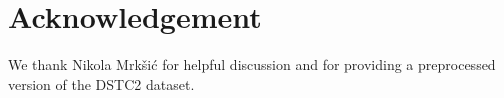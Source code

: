 \documentclass[11pt,a4paper]{article}
\begin{document}
\section*{Acknowledgement}
We thank Nikola Mrk\v{s}i\'{c} for helpful discussion and for providing a preprocessed version of the DSTC2 dataset.


%
%



% 
\end{document}
